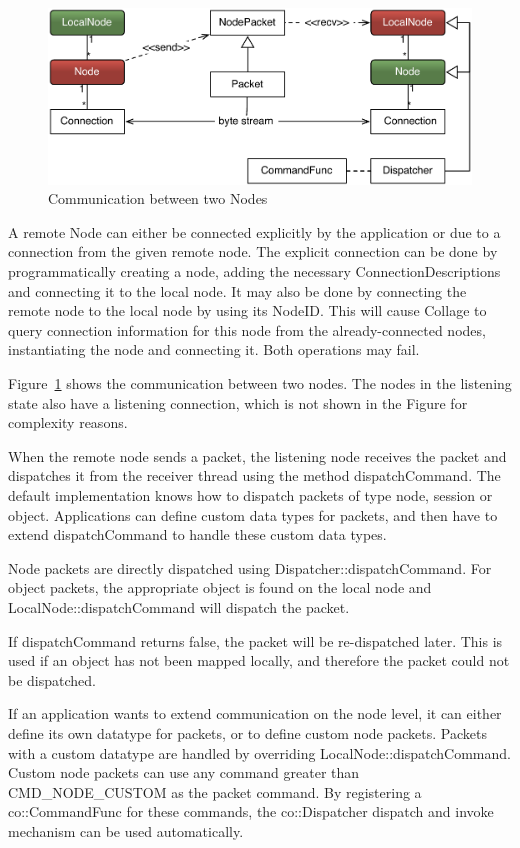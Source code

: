 \documentclass[10pt,a4]{scrartcl}
\newcommand{\fig}[1]{Figure~\ref{#1}}
\begin{document}
\begin{figure}
  \includegraphics[width=.618\textwidth]{images/netNode.pdf}
  {\caption{\label{fNetNode}Communication between two Nodes}}
\end{figure}
A remote \textsf{Node} can either be connected explicitly by the application or
due to a connection from the given remote node. The explicit connection can be
done by programmatically creating a node, adding the necessary
\textsf{ConnectionDescription}s and connecting it to the local node. It may also
be done by connecting the remote node to the local node by using its
\textsf{NodeID}. This will cause Collage to query connection information for
this node from the already-connected nodes, instantiating the node and
connecting it. Both operations may fail.

\fig{fNetNode} shows the communication between two nodes. The nodes in
the listening state also have a listening connection, which is not shown
in the Figure for complexity reasons.

When the remote node sends a packet, the listening node receives the
packet and dispatches it from the receiver thread using the method
\textsf{dispatchCommand}. The default implementation knows how to
dispatch packets of type node, session or object. Applications can
define custom data types for packets, and then have to extend
\textsf{dispatchCommand} to handle these custom data types.

Node packets are directly dispatched using
\textsf{Dispatcher::dispatchCommand}. For object packets, the appropriate object
is found on the local node and \textsf{LocalNode::dispatchCommand} will dispatch
the packet.

If \textsf{dispatchCommand} returns false, the packet will be
re-dispatched later. This is used if an object has not been mapped
locally, and therefore the packet could not be dispatched.

If an application wants to extend communication on the node level, it can either
define its own datatype for packets, or to define custom node packets. Packets
with a custom datatype are handled by overriding
\textsf{LocalNode::dispatchCommand}. Custom node packets can use any command
greater than \textsf{CMD\_NODE\_CUSTOM} as the packet command. By registering a
\textsf{co::CommandFunc} for these commands, the \textsf{co::Dispatcher}
dispatch and invoke mechanism can be used automatically.
\end{document}
